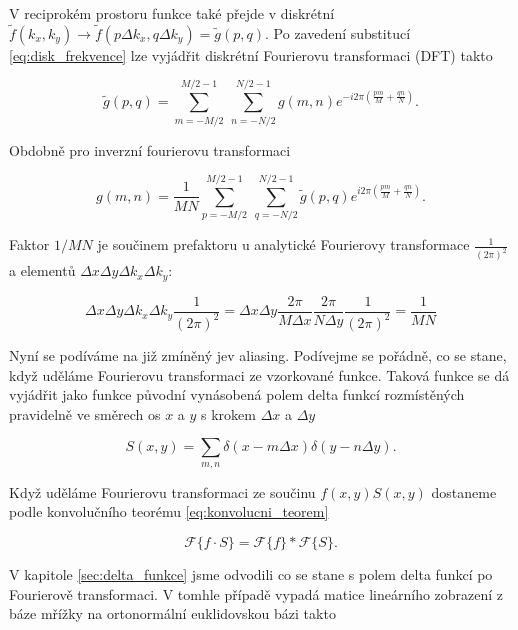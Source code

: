 V reciprokém prostoru funkce také přejde v diskrétní $\widetilde{f}(k_x,k_y) \rightarrow \widetilde{f}(p \Delta k_x, q \Delta k_y) = \widetilde{g}(p,q)$. Po zavedení substitucí \eqref{eq:disk_frekvence} lze vyjádřit diskrétní Fourierovu transformaci (DFT) takto

\begin{equation}
\widetilde{g}(p,q) = \sum_{m=-M/2}^{M/2-1} ~ \sum_{n=-N/2}^{N/2-1} g(m,n) e^{-i 2 \pi \left( \frac{pm}{M} + \frac{qn}{N} \right)}.
\end{equation}

Obdobně pro inverzní fourierovu transformaci

\begin{equation}
g(m,n) = \frac{1}{MN} \sum_{p=-M/2}^{M/2-1} ~ \sum_{q=-N/2}^{N/2-1} \widetilde{g}(p,q) e^{i 2 \pi \left( \frac{pm}{M} + \frac{qn}{N} \right)}.
\end{equation}

Faktor $1/MN$ je součinem prefaktoru u analytické Fourierovy transformace $\frac{1}{(2 \pi)^2}$ a elementů $\Delta x \Delta y \Delta k_x \Delta k_y$:

\begin{equation}
\Delta x \Delta y \Delta k_x \Delta k_y \frac{1}{(2 \pi)^2} = \Delta x \Delta y \frac{2 \pi}{M \Delta x} \frac{2 \pi}{N \Delta y} \frac{1}{(2 \pi)^2} = \frac{1}{MN}
\end{equation}

Nyní se podíváme na již zmíněný jev aliasing. Podívejme se pořádně, co se stane, když uděláme Fourierovu transformaci ze vzorkované funkce. Taková funkce se dá vyjádřit jako funkce původní vynásobená polem delta funkcí rozmístěných pravidelně ve směrech os $x$ a $y$ s krokem $\Delta x$ a $\Delta y$

\begin{equation}
S(x,y) = \sum\limits_{m,n} \delta (x-m\Delta x) \delta(y-n\Delta y).
\end{equation}

Když uděláme Fourierovu transformaci ze součinu $f(x,y) S(x,y)$ dostaneme podle konvolučního teorému \eqref{eq:konvolucni_teorem}

\begin{equation}
\mathscr{F}\{f \cdot S\} = \mathscr{F}\{f\} \ast \mathscr{F}\{S\}.
\end{equation}

V kapitole \ref{sec:delta_funkce} jsme odvodili co se stane s polem delta funkcí po Fourierově transformaci. V tomhle případě vypadá matice lineárního zobrazení z báze mřížky na ortonormální euklidovskou bázi takto

